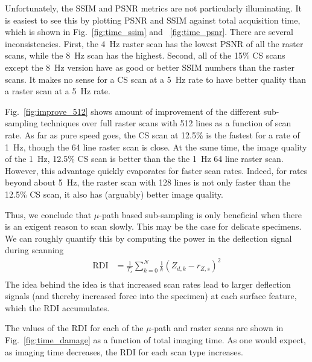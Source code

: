 \documentclass[twocolumn,oneside]{IEEEtran/IEEEtran}
\begin{document}
Unfortunately, the SSIM and PSNR metrics are not particularly
illuminating. It is easiest to see this by plotting PSNR and SSIM
against total acquisition time, which is shown in
Fig.~\ref{fig:time_ssim} and ~\ref{fig:time_psnr}. There are several
inconsistencies. First, the 4~Hz raster scan has the lowest PSNR of
all the raster scans, while the 8~Hz scan has the highest. Second, all
of the 15\% CS scans except the 8~Hz version have as good or better
SSIM numbers than the raster scans. It makes no sense for a CS scan at
a 5~Hz rate to have better quality than a raster scan at a 5~Hz rate.

Fig.~\ref{fig:improve_512} shows amount of improvement of the
different sub-sampling techniques over full raster scans with 512
lines as a function of scan rate. As far as pure speed goes, the CS
scan at 12.5\% is the fastest for a rate of 1~Hz, though the 64 line
raster scan is close. At the same time, the image quality of the 1~Hz,
12.5\% CS scan is better than the the 1~Hz 64 line raster scan.
However, this advantage quickly evaporates for faster scan rates.
Indeed, for rates beyond about 5~Hz, the raster scan with 128 lines is
not only faster than the 12.5\% CS scan, it also has (arguably) better
image quality.

Thus, we conclude that $\mu$-path based sub-sampling is only
beneficial when there is an exigent reason to scan slowly. This may be
the case for delicate specimens. We can roughly quantify this by
computing the power in the deflection signal during scanning
\begin{align}
  \text{RDI} &= \frac{1}{T_s}\sum_{k=0}^N \frac{1}{k} \left(Z_{d,k} - r_{Z,s}\right)^2 \label{eqn:RDI}\\
\end{align}
The idea behind the idea is that increased scan rates lead to larger
deflection signals (and thereby increased force into the specimen) at
each surface feature, which the RDI accumulates.

The values of the RDI for each of the $\mu$-path and raster scans are
shown in Fig.~\ref{fig:time_damage} as a function of total imaging
time. As one would expect, as imaging time decreases, the RDI for each
scan type increases.
\end{document}
